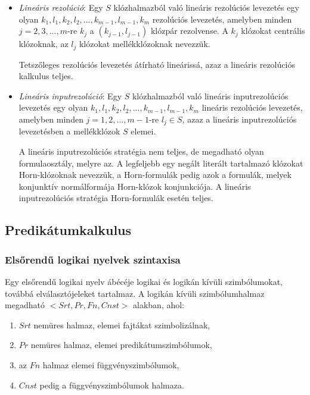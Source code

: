 \documentclass[margin=0px]{article}
\begin{document}
	\begin{itemize}
		\item	\textit{Lineáris rezolúció}: Egy $S$ klózhalmazból való lineáris rezolúciós levezetés egy olyan
		$k_{1},l_{1},k_{2},l_{2}, ..., k_{m-1},l_{m-1}, k_{m}$ rezolúciós levezetés, amelyben minden
		$j = 2, 3, ..., m$-re $k_{j}$ a $(k_{j-1},l_{j-1})$ klózpár rezolvense. A $k_{j}$ klózokat centrális
		klózoknak, az $l_{j}$ klózokat mellékklózoknak nevezzük.		
		
		Tetszőleges rezolúciós levezetés átírható lineárissá, azaz a lineáris rezolúciós kalkulus teljes.
		
		\item	\textit{Lineáris inputrezolúció}: Egy $S$ klózhalmazból való lineáris inputrezolúciós levezetés
		egy olyan $k_{1},l_{1},k_{2},l_{2}, ..., k_{m-1},l_{m-1}, k_{m}$ lineáris rezolúciós levezetés, amelyben minden
		$j = 1, 2, ..., m-1$-re $l_{j} \in S$, azaz a lineáris inputrezolúciós levezetésben a mellékklózok $S$ elemei.
		
		A lineáris inputrezolúciós stratégia nem teljes, de megadható olyan formulaosztály, melyre az. A legfeljebb egy
		negált literált tartalmazó klózokat Horn-klózoknak nevezzük, a Horn-formulák pedig azok a formulák, melyek
		konjunktív normálformája Horn-klózok konjunkciója. A lineáris inputrezolúciós stratégia Horn-formulák esetén teljes.
	\end{itemize}
	
	\subsection{Predikátumkalkulus}
	
	\subsubsection{Elsőrendű logikai nyelvek szintaxisa}
	
	Egy elsőrendű logikai nyelv ábécéje logikai és logikán kívüli szimbólumokat, továbbá elválasztójeleket tartalmaz.
	A logikán kívüli szimbólumhalmaz megadható $<Srt, Pr, Fn, Cnst>$ alakban, ahol:
	
	\begin{enumerate}
		\item	$Srt$ nemüres halmaz, elemei fajtákat szimbolizálnak,
		
		\item	$Pr$ nemüres halmaz, elemei predikátumszimbólumok,
		
		\item	az $Fn$ halmaz elemei függvényszimbólumok,
		
		\item	$Cnst$ pedig a függvényszimbólumok halmaza.
	\end{enumerate}
	
\end{document}
